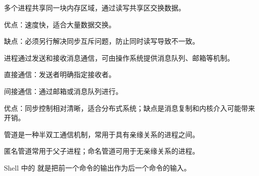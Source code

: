 \begin{points}
  \item 多个进程共享同一块内存区域，通过读写共享区交换数据。
  \item 优点：速度快，适合大量数据交换。
  \item 缺点：必须另行解决同步互斥问题，防止同时读写导致不一致。
\end{points}


\begin{points}
  \item 进程通过发送和接收消息通信，可由操作系统提供消息队列、邮箱等机制。
  \item 直接通信：发送者明确指定接收者。
  \item 间接通信：通过邮箱或消息队列进行。
  \item 优点：同步控制相对清晰，适合分布式系统；缺点是消息复制和内核介入可能带来开销。
\end{points}


\begin{points}
  \item 管道是一种半双工通信机制，常用于具有亲缘关系的进程之间。
  \item 匿名管道常用于父子进程；命名管道可用于无亲缘关系的进程。
  \item Shell 中的 \code{|} 就是把前一个命令的输出作为后一个命令的输入。
\end{points}


